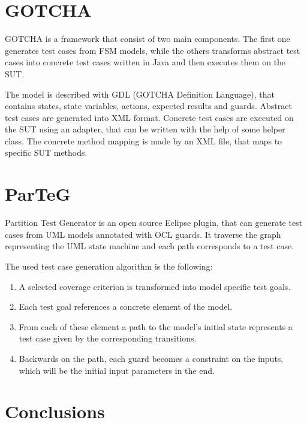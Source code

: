 
\section{GOTCHA}
\label{sec:gotcha}

GOTCHA is a framework that consist of two main components. The first one generates test cases from FSM models, while the others transforms abstract test cases into concrete test cases written in Java and then executes them on the SUT.

The model is described with GDL (GOTCHA Definition Language), that contains states, state variables, actions, expected results and guards. Abstract test cases are generated into XML format. Concrete test cases are executed on the SUT using an adapter, that can be written with the help of some helper class. The concrete method mapping is made by an XML file, that maps to specific SUT methods.


\section{ParTeG}
\label{sec:parteg}

Partition Test Generator is an open source Eclipse plugin, that can generate test cases from UML models annotated with OCL guards. It traverse the graph representing the UML state machine and each path corresponds to a test case.

The used test case generation algorithm is the following:

\begin{enumerate}
	\item A selected coverage criterion is transformed into model specific test goals.
	\item Each test goal references a concrete element of the model.
	\item From each of these element a path to the model's initial state represents a test case given by the corresponding transitions.
	\item Backwards on the path, each guard becomes a constraint on the inputs, which will be the initial input parameters in the end.
\end{enumerate}


\section{Conclusions}
\label{sec:conclusions}

